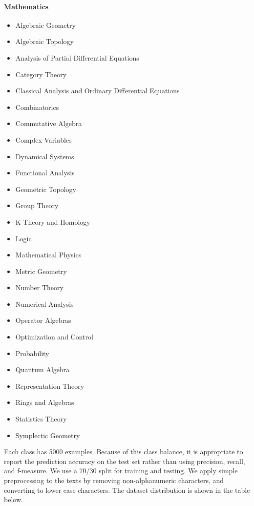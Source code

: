 \paragraph{Mathematics}
\begin{itemize}
\setlength\itemsep{.0001em}
\item Algebraic Geometry
\item Algebraic Topology
\item Analysis of Partial Differential Equations
\item Category Theory
\item Classical Analysis and Ordinary Differential Equations
\item Combinatorics
\item Commutative Algebra
\item Complex Variables
\item Dynamical Systems
\item Functional Analysis
\item Geometric Topology
\item Group Theory
\item  K-Theory and Homology
\item Logic
\item Mathematical Physics
\item Metric Geometry
\item Number Theory
\item Numerical Analysis
\item Operator Algebras
\item Optimization and Control
\item Probability
\item Quantum Algebra
\item Representation Theory
\item Rings and Algebras
\item Statistics Theory
\item Symplectic Geometry
\end{itemize}
Each class has 5000 examples. Because of this class balance, it is appropriate to
report the prediction accuracy on the test set rather than using precision, recall, and f-measure. We use a 70/30 split for training and testing. We apply simple preprocessing to the texts by removing non-alphanumeric
characters, and converting to lower case characters. The dataset distribution is shown in the table below.


